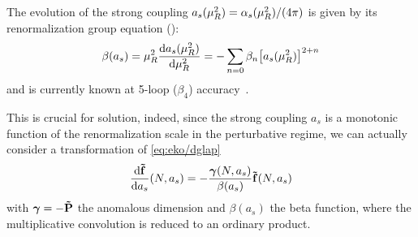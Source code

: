 The evolution of the strong coupling $a_s(\mu_R^2) = \alpha_s(\mu_R^2)/(4\pi)$
is given by its renormalization group equation (\rge):
\begin{equation}
    \beta(a_s) = \muR^2\dv{a_s(\muR^2)}{\muR^2}{} = - \sum\limits_{n=0} \beta_n \qty[a_s(\muR^2)]^{2+n}
\end{equation}
and is currently known at 5-loop ($\beta_4$)
accuracy~\cite{Herzog:2017ohr,Luthe:2016ima,Baikov:2016tgj,Chetyrkin:2017bjc,Luthe:2017ttg}.

This is crucial for \dglap{} solution, indeed, since the strong coupling $a_s$
is a monotonic function of the renormalization scale in the perturbative
regime, we can actually consider a transformation of
\cref{eq:eko/dglap}
\begin{equation}
    \dv{\vb{\tilde f}}{a_s}{}(N,a_s) = - \frac{\bm{\gamma}(N,a_s)}{\beta(a_s)} \vb {\tilde f}(N, a_s)
    \label{eq:eko/dglap2}
\end{equation}
with $\bm{\gamma} = - \vb{\tilde P}$ the anomalous dimension and $\beta(a_s)$
the \qcd{} beta function, where the multiplicative convolution is reduced to an
ordinary product.

